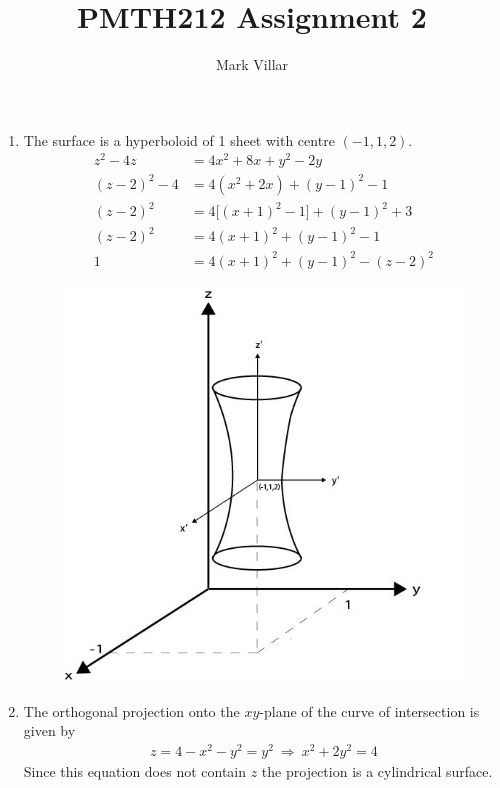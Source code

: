 \documentclass[12pt]{amsart}
\title{PMTH212 Assignment 2}
\author{Mark Villar}
\begin{document}
 

\maketitle 

\begin{enumerate}
	
	\item The surface is a hyperboloid of 1 sheet with centre $(-1,1,2)$.
		\begin{align*}
			z^2-4z&=4x^2+8x+y^2-2y \\
			(z-2)^2-4&=4(x^2+2x)+(y-1)^2-1 \\
			(z-2)^2&=4\big[(x+1)^2-1\big]+(y-1)^2+3 \\
			(z-2)^2&=4(x+1)^2+(y-1)^2-1 \\
			1&=4(x+1)^2+(y-1)^2-(z-2)^2
		\end{align*}
		\begin{figure}[h]
					\centering
					\includegraphics[width=5in]{Hyperboloid.jpg}
				\end{figure}
	\item The orthogonal projection onto the $xy$-plane of the curve of intersection is given by
		\begin{align*}
			z=4-x^2-y^2=y^2 \ \Rightarrow \ x^2+2y^2=4
		\end{align*}
		Since this equation does not contain $z$ the projection is a cylindrical surface. \\
				

\end{enumerate}
\end{document}
